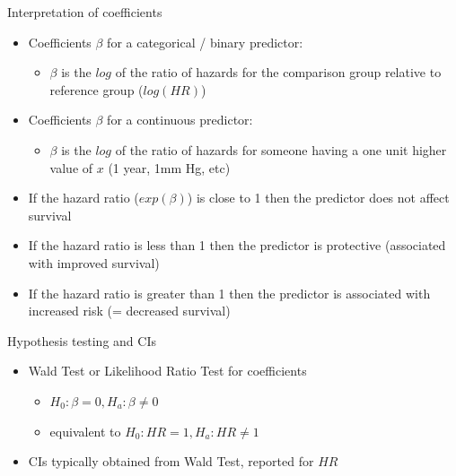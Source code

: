 \documentclass[
  ignorenonframetext,
]{beamer}
\providecommand{\tightlist}{%
  \setlength{\itemsep}{0pt}\setlength{\parskip}{0pt}}
\begin{document}
\begin{frame}{Interpretation of coefficients}
\protect\hypertarget{interpretation-of-coefficients}{}

\begin{itemize}
\tightlist
\item
  Coefficients \(\beta\) for a categorical / binary predictor:

  \begin{itemize}
  \tightlist
  \item
    \(\beta\) is the \(log\) of the ratio of hazards for the comparison
    group relative to reference group (\(log(HR)\))
  \end{itemize}
\item
  Coefficients \(\beta\) for a continuous predictor:

  \begin{itemize}
  \tightlist
  \item
    \(\beta\) is the \(log\) of the ratio of hazards for someone having
    a one unit higher value of \(x\) (1 year, 1mm Hg, etc)
  \end{itemize}
\item
  If the hazard ratio (\(exp(\beta)\)) is close to 1 then the predictor
  does not affect survival
\item
  If the hazard ratio is less than 1 then the predictor is protective
  (associated with improved survival)
\item
  If the hazard ratio is greater than 1 then the predictor is associated
  with increased risk (= decreased survival)
\end{itemize}

\end{frame}

\begin{frame}{Hypothesis testing and CIs}
\protect\hypertarget{hypothesis-testing-and-cis}{}

\begin{itemize}
\tightlist
\item
  Wald Test or Likelihood Ratio Test for coefficients

  \begin{itemize}
  \tightlist
  \item
    \(H_0: \beta=0, H_a: \beta \neq 0\)
  \item
    equivalent to \(H_0: HR=1, H_a: HR \neq 1\)
  \end{itemize}
\item
  CIs typically obtained from Wald Test, reported for \(HR\)
\end{itemize}

\end{frame}
\end{document}
